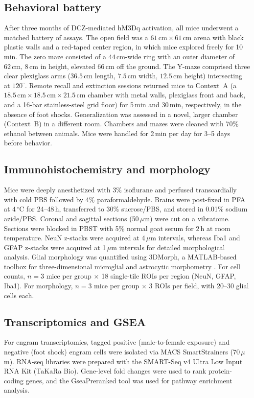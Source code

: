 \documentclass[11pt]{article}
\begin{document}
\subsection{Behavioral battery}
After three months of DCZ-mediated hM3Dq activation, all mice underwent a matched battery of assays. The open field was a $61\,\mathrm{cm}\times 61\,\mathrm{cm}$ arena with black plastic walls and a red-taped center region, in which mice explored freely for 10\,min. The zero maze consisted of a $44\,\mathrm{cm}$-wide ring with an outer diameter of $62\,\mathrm{cm}$, $8\,\mathrm{cm}$ in height, elevated $66\,\mathrm{cm}$ off the ground. The Y-maze comprised three clear plexiglass arms ($36.5\,\mathrm{cm}$ length, $7.5\,\mathrm{cm}$ width, $12.5\,\mathrm{cm}$ height) intersecting at $120^{\circ}$. Remote recall and extinction sessions returned mice to Context~A (a $18.5\,\mathrm{cm}\times 18.5\,\mathrm{cm}\times 21.5\,\mathrm{cm}$ chamber with metal walls, plexiglass front and back, and a 16-bar stainless-steel grid floor) for 5\,min and 30\,min, respectively, in the absence of foot shocks. Generalization was assessed in a novel, larger chamber (Context~B) in a different room. Chambers and mazes were cleaned with 70\% ethanol between animals. Mice were handled for 2\,min per day for 3--5 days before behavior.

\subsection{Immunohistochemistry and morphology}
Mice were deeply anesthetized with 3\% isoflurane and perfused transcardially with cold PBS followed by 4\% paraformaldehyde. Brains were post-fixed in PFA at $4\,^{\circ}\mathrm{C}$ for 24--48\,h, transferred to 30\% sucrose/PBS, and stored in 0.01\% sodium azide/PBS. Coronal and sagittal sections (50\,$\mu$m) were cut on a vibratome. Sections were blocked in PBST with 5\% normal goat serum for 2\,h at room temperature. NeuN z-stacks were acquired at 4\,$\mu$m intervals, whereas Iba1 and GFAP z-stacks were acquired at 1\,$\mu$m intervals for detailed morphological analysis. Glial morphology was quantified using 3DMorph, a MATLAB-based toolbox for three-dimensional microglial and astrocytic morphometry \citep{york2018threedmorph}. For cell counts, $n=3$ mice per group $\times$ 18 single-tile ROIs per region (NeuN, GFAP, Iba1). For morphology, $n=3$ mice per group $\times$ 3 ROIs per field, with 20--30 glial cells each.

\subsection{Transcriptomics and GSEA}
For engram transcriptomics, tagged positive (male-to-female exposure) and negative (foot shock) engram cells were isolated via MACS SmartStrainers (70\,$\mu$m). RNA-seq libraries were prepared with the SMART-Seq v4 Ultra Low Input RNA Kit (TaKaRa Bio). Gene-level fold changes were used to rank protein-coding genes, and the GseaPreranked tool was used for pathway enrichment analysis.
\end{document}
